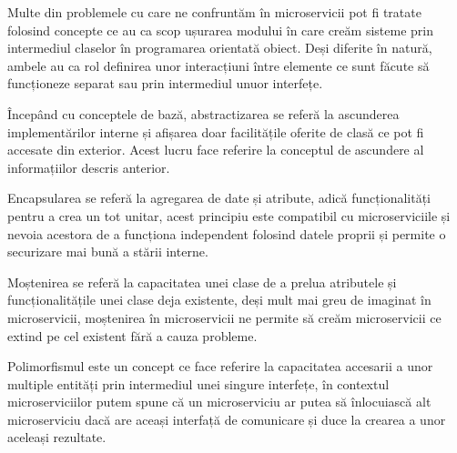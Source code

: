 Multe din problemele cu care ne confruntăm în microservicii pot fi tratate folosind concepte
ce au ca scop ușurarea modului în care creăm sisteme prin intermediul claselor în programarea 
orientată obiect. Deși diferite în natură, ambele au ca rol definirea unor interacțiuni între
elemente ce sunt făcute să funcționeze separat sau prin intermediul unuor interfețe.

Începând cu conceptele de bază, abstractizarea se referă la ascunderea implementărilor interne
și afișarea doar facilitățile oferite de clasă ce pot fi accesate din exterior. Acest lucru face 
referire la conceptul de ascundere al informațiilor descris anterior.

Encapsularea se referă la agregarea de date și atribute, adică funcționalități pentru a crea un tot
unitar, acest principiu este compatibil cu microserviciile și nevoia acestora de a funcționa
independent folosind datele proprii și permite o securizare mai bună a stării interne.

Moștenirea se referă la capacitatea unei clase de a prelua atributele și funcționalitățile unei clase
deja existente, deși mult mai greu de imaginat în microservicii, moștenirea în microservicii ne permite
să creăm microservicii ce extind pe cel existent fără a cauza probleme.

Polimorfismul este un concept ce face referire la capacitatea accesarii a unor multiple entități
prin intermediul unei singure interfețe, în contextul microserviciilor putem spune că un microserviciu
ar putea să înlocuiască alt microserviciu dacă are aceași interfață de comunicare și duce la
crearea a unor aceleași rezultate.

